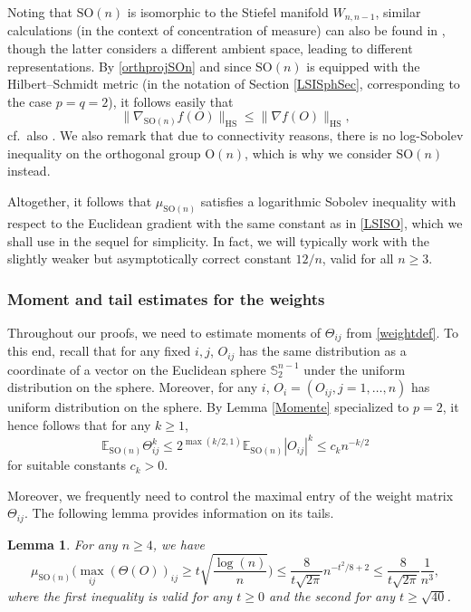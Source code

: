 \documentclass[a4paper,12pt]{amsart}
\numberwithin{equation}{section}
\newtheorem{lemma}[satz]{Lemma}
\theoremstyle{remark}
\def\E{{\mathbb E}}
\def\S{{\mathbb S}}
\begin{document}
Noting that $\mathrm{SO}(n)$ is isomorphic to the Stiefel manifold $W_{n,n-1}$, similar calculations (in the context of concentration of measure) can also be found in \cite[Sect.\ 3]{GS23}, though the latter considers a different ambient space, leading to different representations. By \eqref{orthprojSOn} and since $\mathrm{SO}(n)$ is equipped with the Hilbert--Schmidt metric (in the notation of Section \ref{LSISphSec}, corresponding to the case $p=q=2$), it follows easily that
\[  \lVert\nabla_{\mathrm{SO}(n)} f(O)\rVert_{\mathrm{HS}} \le  \lVert\nabla f(O)\rVert_{\mathrm{HS}}, \]
cf.\ also \cite[Prop.\ 3.1]{GS23}. We also remark that due to connectivity reasons, there is no log-Sobolev inequality on the orthogonal group $\mathrm{O}(n)$, which is why we consider $\mathrm{SO}(n)$ instead.

Altogether, it follows that $\mu_{\mathrm{SO}(n)}$ satisfies a logarithmic Sobolev inequality with respect to the Euclidean gradient with the same constant as in \eqref{LSISO}, which we shall use in the sequel for simplicity. In fact, we will typically work with the slightly weaker but asymptotically correct constant $12/n$, valid for all $n \ge 3$.

\subsubsection{Moment and tail estimates for the weights}

Throughout our proofs, we need to estimate moments of $\Theta_{ij}$ from \eqref{weightdef}. To this end, recall that for any fixed $i,j$, $O_{ij}$ has the same distribution as a coordinate of a vector on the Euclidean sphere $\S_2^{n-1}$ under the uniform distribution on the sphere. Moreover, for any $i$, $O_i=(O_{ij}, j=1, \ldots,n)$ has uniform distribution on the sphere. By Lemma \ref{Momente} specialized to $p=2$, it hence follows that for any $k \ge 1$,
\begin{equation}\label{eq:MomTh}
    \E_{\mathrm{SO}(n)} \Theta_{ij}^k \le 2^{\max(k/2,1)} \E_{\mathrm{SO}(n)} |O_{ij}|^k \le c_k n^{-k/2}
\end{equation}
for suitable constants $c_k > 0$.

Moreover, we frequently need to control the maximal entry of the weight matrix $\Theta_{ij}$. The following lemma provides information on its tails.

\begin{lemma}\label{lem:TailsMaxWei}
    For any $n \ge 4$, we have
    \[
    \mu_{\mathrm{SO}(n)}\Big(\max_{ij} (\Theta(O))_{ij} \ge t\sqrt{\frac{\log(n)}{n}}\Big) \le \frac{8}{t\sqrt{2\pi}}n^{-t^2/8+2} \le \frac{8}{t\sqrt{2\pi}} \frac{1}{n^3},
    \]
    where the first inequality is valid for any $t \ge 0$ and the second for any $t \ge \sqrt{40}$.
\end{lemma}
\end{document}
